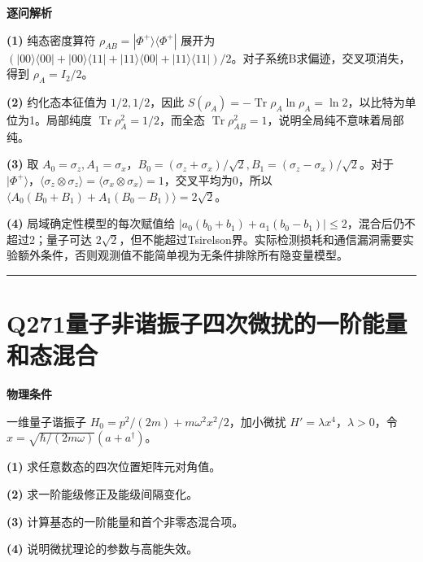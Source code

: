 \documentclass[UTF8,a4paper,11pt,oneside,openany]{ctexbook}
\begin{document}
\par\medskip\noindent\textbf{逐问解析}
\par\noindent\textbf{(1)} 纯态密度算符 \(\rho_{AB}=|\Phi^+\rangle\langle\Phi^+|\) 展开为 \((|00\rangle\langle00|+|00\rangle\langle11|+|11\rangle\langle00|+|11\rangle\langle11|)/2\)。对子系统B求偏迹，交叉项消失，得到 \(\rho_A=I_2/2\)。
\par\noindent\textbf{(2)} 约化态本征值为 \(1/2,1/2\)，因此 \(S(\rho_A)=-\operatorname{Tr}\rho_A\ln\rho_A=\ln2\)，以比特为单位为1。局部纯度 \(\operatorname{Tr}\rho_A^2=1/2\)，而全态 \(\operatorname{Tr}\rho_{AB}^2=1\)，说明全局纯不意味着局部纯。
\par\noindent\textbf{(3)} 取 \(A_0=\sigma_z,A_1=\sigma_x\)，\(B_0=(\sigma_z+\sigma_x)/\sqrt2,B_1=(\sigma_z-\sigma_x)/\sqrt2\)。对于 \(|\Phi^+\rangle\)，\(\langle\sigma_z\otimes\sigma_z\rangle=\langle\sigma_x\otimes\sigma_x\rangle=1\)，交叉平均为0，所以 \(\langle A_0(B_0+B_1)+A_1(B_0-B_1)\rangle=2\sqrt2\)。
\par\noindent\textbf{(4)} 局域确定性模型的每次赋值给 \(|a_0(b_0+b_1)+a_1(b_0-b_1)|\le2\)，混合后仍不超过2；量子可达 \(2\sqrt2\)，但不能超过Tsirelson界。实际检测损耗和通信漏洞需要实验额外条件，否则观测值不能简单视为无条件排除所有隐变量模型。

\par\bigskip\hrule\bigskip
\section*{Q271\quad 量子非谐振子四次微扰的一阶能量和态混合}
\textbf{物理条件}\par 一维量子谐振子 \(H_0=p^2/(2m)+m\omega^2x^2/2\)，加小微扰 \(H'=\lambda x^4\)，\(\lambda>0\)，令 \(x=\sqrt{\hbar/(2m\omega)}(a+a^\dagger)\)。
\par\noindent\textbf{(1)} 求任意数态的四次位置矩阵元对角值。
\par\noindent\textbf{(2)} 求一阶能级修正及能级间隔变化。
\par\noindent\textbf{(3)} 计算基态的一阶能量和首个非零态混合项。
\par\noindent\textbf{(4)} 说明微扰理论的参数与高能失效。
\end{document}
